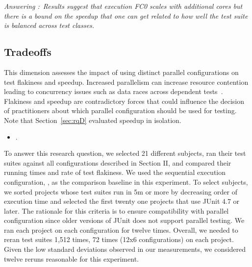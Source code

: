 \documentclass[10pt,journal,compsoc]{IEEEtran}
\begin{document}
\begin{mdframed}
\noindent\textit{Answering \numRQSpeedupTwo{}:}~\emph{Results suggest that
  execution FC0 scales with additional cores but there is a bound
  on the speedup that one can get related to how well the test suite is
  balanced across test classes.}
\end{mdframed}

\subsection{Tradeoffs}
\label{sec:rq6-tradeoffs}

This dimension assesses the impact of using distinct parallel
configurations on test flakiness and speedup.  Increased parallelism
can increase resource contention leading to concurrency issues such as
data races across dependent
tests~\cite{luo-etal-fse2014,bell-etal-esecfse2015}.  Flakiness and
speedup are contradictory forces that could influence the decision of
practitioners about which parallel configuration should be used for
testing.  Note that Section~\ref{sec:rqD} evaluated speedup in
isolation.

\begin{itemize}
  \item \numRQIssuesOne{}. \textbf{\RQIssuesOne{}}
\end{itemize}



To answer this research question, we selected 21 different subjects,
ran their test suites against all configurations described in
Section II, and compared their running times and rate of
test flakiness.  We used the sequential execution configuration,
\emph{\Seq{}}, as the comparison baseline in this experiment.  To
select subjects, we sorted projects whose test suites run in 5m or
more by decreasing order of execution time and selected the first
twenty one projects that use JUnit 4.7 or later.  The rationale for this
criteria is to ensure compatibility with parallel configuration since
older versions of JUnit does not support parallel testing.  We ran
each project on each configuration for twelve times.
Overall, we needed to reran test suites 1,512 times, 72 times (12x6
configurations) on each project.  Given the low standard deviations
observed in our measurements, we considered twelve reruns reasonable for this
experiment.
\end{document}
